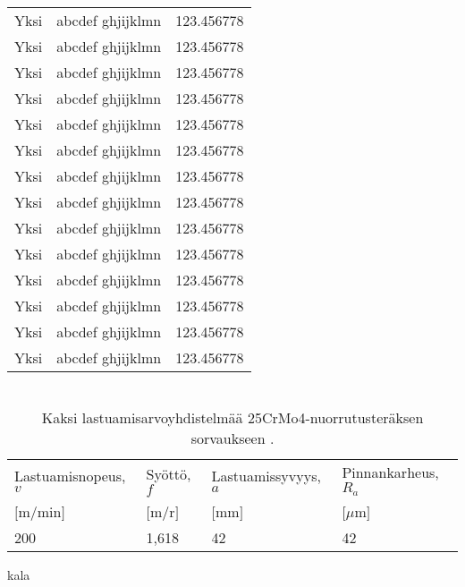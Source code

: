 \documentclass{LUT_pohja}[2016/03/09 LUT Dippa Pohja]
\begin{document}
\begin{appendices}
\begin{longtable}[l]{|l|l|l|}
Yksi & abcdef ghjijklmn & 123.456778 \\
Yksi & abcdef ghjijklmn & 123.456778 \\
Yksi & abcdef ghjijklmn & 123.456778 \\
Yksi & abcdef ghjijklmn & 123.456778 \\
Yksi & abcdef ghjijklmn & 123.456778 \\
Yksi & abcdef ghjijklmn & 123.456778 \\
Yksi & abcdef ghjijklmn & 123.456778 \\
Yksi & abcdef ghjijklmn & 123.456778 \\
Yksi & abcdef ghjijklmn & 123.456778 \\
Yksi & abcdef ghjijklmn & 123.456778 \\
Yksi & abcdef ghjijklmn & 123.456778 \\
Yksi & abcdef ghjijklmn & 123.456778 \\
Yksi & abcdef ghjijklmn & 123.456778 \\
Yksi & abcdef ghjijklmn & 123.456778 \\
\end{longtable}





\newpage
\section{}
\begin{table}[htb]
\caption{Kaksi lastuamisarvoyhdistelmää 25CrMo4-nuorrutusteräksen sorvaukseen \citep[s. 34]{Varis97}.}
\begin{tabular}{|l|l|l|l|}
	\hline
  Lastuamisnopeus, $v$ & Syöttö, $f$  & Lastuamissyvyys, $a$ & Pinnankarheus, $R_{a}$\\
  $[$m/min$]$ & $[$m/r$]$ & $[$mm$]$ & $[\mu$m$]$\\ \hline
  200 & 1,618 & 42 & 42\\ \hline
\end{tabular}
\end{table}
kala 


\newpage
\section{}


\end{appendices}
\end{document}
